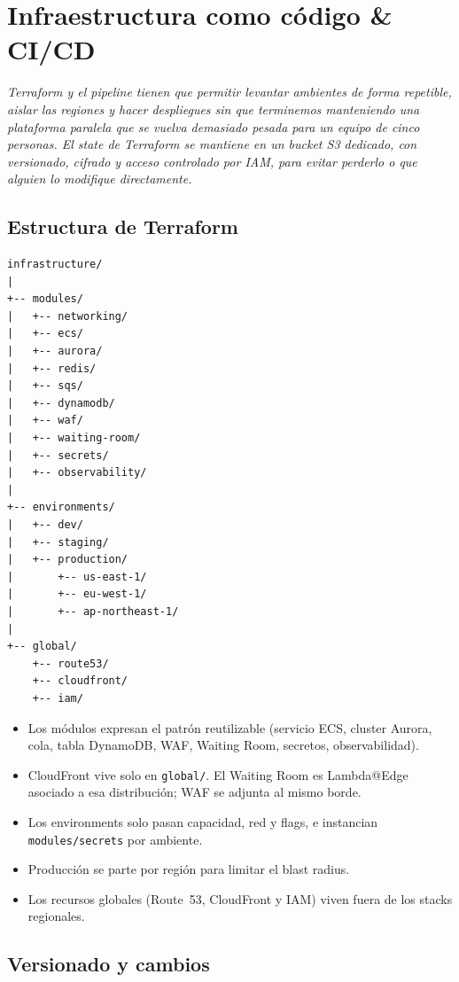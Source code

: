 \documentclass[11pt,a4paper]{article}
\newcommand{\sectionintro}[1]{\vspace{-0.15em}\textit{\textcolor{livetixgray}{#1}}\par\vspace{0.45em}}
\begin{document}
\section{Infraestructura como código \& CI/CD}

\sectionintro{Terraform y el pipeline tienen que permitir levantar ambientes de forma repetible, aislar las regiones y hacer despliegues sin que terminemos manteniendo una plataforma paralela que se vuelva demasiado pesada para un equipo de cinco personas. El state de Terraform se mantiene en un bucket S3 dedicado, con versionado, cifrado y acceso controlado por IAM, para evitar perderlo o que alguien lo modifique directamente.}

\subsection{Estructura de Terraform}

\begin{verbatim}
infrastructure/
|
+-- modules/
|   +-- networking/
|   +-- ecs/
|   +-- aurora/
|   +-- redis/
|   +-- sqs/
|   +-- dynamodb/
|   +-- waf/
|   +-- waiting-room/
|   +-- secrets/
|   +-- observability/
|
+-- environments/
|   +-- dev/
|   +-- staging/
|   +-- production/
|       +-- us-east-1/
|       +-- eu-west-1/
|       +-- ap-northeast-1/
|
+-- global/
    +-- route53/
    +-- cloudfront/
    +-- iam/
\end{verbatim}

\begin{itemize}
    \item Los módulos expresan el patrón reutilizable (servicio ECS, cluster Aurora, cola, tabla DynamoDB, WAF, Waiting Room, secretos, observabilidad).
    \item CloudFront vive solo en \texttt{global/}. El Waiting Room es Lambda@Edge asociado a esa distribución; WAF se adjunta al mismo borde.
    \item Los environments solo pasan capacidad, red y flags, e instancian \texttt{modules/secrets} por ambiente.
    \item Producción se parte por región para limitar el blast radius.
    \item Los recursos globales (Route~53, CloudFront y IAM) viven fuera de los stacks regionales.
\end{itemize}

\subsection{Versionado y cambios}
\end{document}
